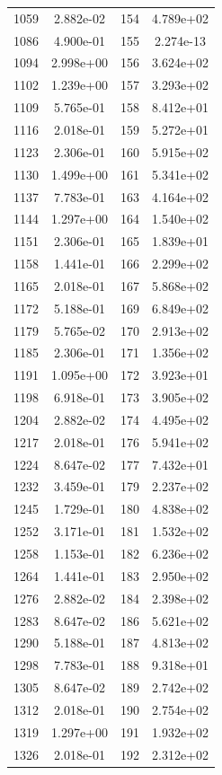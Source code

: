 \documentclass[12pt]{article}
\begin{document}
\begin{longtable}{@{}cccc@{}}
1059 & 2.882e-02 & 154 & 4.789e+02 \\
1086 & 4.900e-01 & 155 & 2.274e-13 \\
1094 & 2.998e+00 & 156 & 3.624e+02 \\
1102 & 1.239e+00 & 157 & 3.293e+02 \\
1109 & 5.765e-01 & 158 & 8.412e+01 \\
1116 & 2.018e-01 & 159 & 5.272e+01 \\
1123 & 2.306e-01 & 160 & 5.915e+02 \\
1130 & 1.499e+00 & 161 & 5.341e+02 \\
1137 & 7.783e-01 & 163 & 4.164e+02 \\
1144 & 1.297e+00 & 164 & 1.540e+02 \\
1151 & 2.306e-01 & 165 & 1.839e+01 \\
1158 & 1.441e-01 & 166 & 2.299e+02 \\
1165 & 2.018e-01 & 167 & 5.868e+02 \\
1172 & 5.188e-01 & 169 & 6.849e+02 \\
1179 & 5.765e-02 & 170 & 2.913e+02 \\
1185 & 2.306e-01 & 171 & 1.356e+02 \\
1191 & 1.095e+00 & 172 & 3.923e+01 \\
1198 & 6.918e-01 & 173 & 3.905e+02 \\
1204 & 2.882e-02 & 174 & 4.495e+02 \\
1217 & 2.018e-01 & 176 & 5.941e+02 \\
1224 & 8.647e-02 & 177 & 7.432e+01 \\
1232 & 3.459e-01 & 179 & 2.237e+02 \\
1245 & 1.729e-01 & 180 & 4.838e+02 \\
1252 & 3.171e-01 & 181 & 1.532e+02 \\
1258 & 1.153e-01 & 182 & 6.236e+02 \\
1264 & 1.441e-01 & 183 & 2.950e+02 \\
1276 & 2.882e-02 & 184 & 2.398e+02 \\
1283 & 8.647e-02 & 186 & 5.621e+02 \\
1290 & 5.188e-01 & 187 & 4.813e+02 \\
1298 & 7.783e-01 & 188 & 9.318e+01 \\
1305 & 8.647e-02 & 189 & 2.742e+02 \\
1312 & 2.018e-01 & 190 & 2.754e+02 \\
1319 & 1.297e+00 & 191 & 1.932e+02 \\
1326 & 2.018e-01 & 192 & 2.312e+02 \\

\end{longtable}
\end{document}
